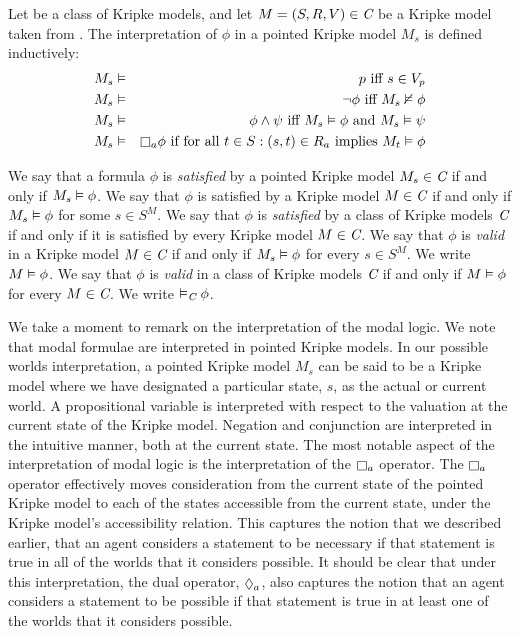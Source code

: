 \begin{definition}
Let \classC{} be a class of Kripke models, and let $M = (S, R, V) \in \textit{C}$
be a Kripke model taken from \classC{}. The interpretation of $\phi$ in a
pointed Kripke model $M_s$ is defined inductively:
\begin{eqnarray*}
M_s &\entails& p \text{ iff } s \in V_p\\
M_s &\entails& \neg \phi \text{ iff } M_s \nentails \phi\\
M_s &\entails& \phi \land \psi \text{ iff } M_s \entails \phi \text{ and } M_s
\entails \psi\\
M_s &\entails& \knows_a \phi \text{ if for all } t \in S : (s, t) \in R_a \text{
implies } M_t \entails \phi
\end{eqnarray*}
\end{definition}

We say that a formula $\phi$ is {\em satisfied} by a pointed Kripke model $M_s
\in \textit{C}$ if and only if $M_s \vDash \phi$. We say that $\phi$ is satisfied
by a Kripke model $M \in \textit{C}$ if and only if $M_s \vDash \phi$ for some $s
\in S^M$. We say that $\phi$ is {\em satisfied} by a class of Kripke models
$\textit{C}$ if and only if it is satisfied by every Kripke model $M \in \textit{C}$.
We say that $\phi$ is {\em valid} in a Kripke model $M \in \textit{C}$ if and only
if $M_s \vDash \phi$ for every $s \in S^M$. We write $M \vDash \phi$. We say
that $\phi$ is {\em valid} in a class of Kripke models $\textit{C}$ if and only if
$M \vDash \phi$ for every $M \in \textit{C}$. We write $\vDash_{\textit{C}} \phi$.

We take a moment to remark on the interpretation of the modal logic. We note
that modal formulae are interpreted in pointed Kripke models. In our possible
worlds interpretation, a pointed Kripke model $M_s$ can be said to be a Kripke
model where we have designated a particular state, $s$, as the actual or current
world. A propositional variable is interpreted with respect to the valuation at
the current state of the Kripke model. Negation and conjunction are interpreted
in the intuitive manner, both at the current state. The most notable aspect of
the interpretation of modal logic is the interpretation of the $\knows_a$
operator.  The $\knows_a$ operator effectively moves consideration from the
current state of the pointed Kripke model to each of the states accessible from
the current state, under the Kripke model's accessibility relation. This
captures the notion that we described earlier, that an agent considers a
statement to be necessary if that statement is true in all of the worlds that it
considers possible. It should be clear that under this interpretation, the dual
operator, $\suspects_a$, also captures the notion that an agent considers a
statement to be possible if that statement is true in at least one of the worlds
that it considers possible.

